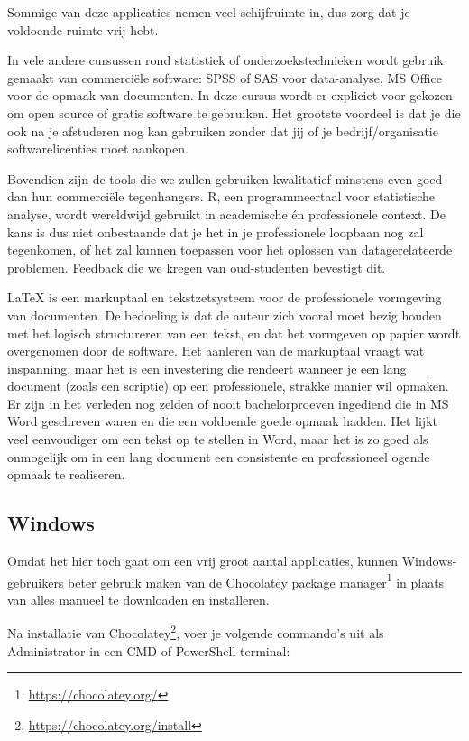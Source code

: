 Sommige van deze applicaties nemen veel schijfruimte in, dus zorg dat je voldoende ruimte vrij hebt.

In vele andere cursussen rond statistiek of onderzoekstechnieken wordt gebruik gemaakt van commerciële software: SPSS of SAS voor data-analyse, MS Office voor de opmaak van documenten. In deze cursus wordt er expliciet voor gekozen om open source of gratis software te gebruiken. Het grootste voordeel is dat je die ook na je afstuderen nog kan gebruiken zonder dat jij of je bedrijf/organisatie softwarelicenties moet aankopen.

Bovendien zijn de tools die we zullen gebruiken kwalitatief minstens even goed dan hun commerciële tegenhangers. R, een programmeertaal voor statistische analyse, wordt wereldwijd gebruikt in academische én professionele context. De kans is dus niet onbestaande dat je het in je professionele loopbaan nog zal tegenkomen, of het zal kunnen toepassen voor het oplossen van datagerelateerde problemen. Feedback die we kregen van oud-studenten bevestigt dit.

\LaTeX{} is een markuptaal en tekstzetsysteem voor de professionele vormgeving van documenten. De bedoeling is dat de auteur zich vooral moet bezig houden met het logisch structureren van een tekst, en dat het vormgeven op papier wordt overgenomen door de software. Het aanleren van de markuptaal vraagt wat inspanning, maar het is een investering die rendeert wanneer je een lang document (zoals een scriptie) op een professionele, strakke manier wil opmaken. Er zijn in het verleden nog zelden of nooit bachelorproeven ingediend die in MS Word geschreven waren en die een voldoende goede opmaak hadden. Het lijkt veel eenvoudiger om een tekst op te stellen in Word, maar het is zo goed als onmogelijk om in een lang document een consistente en professioneel ogende opmaak te realiseren.

\subsection{Windows}

Omdat het hier toch gaat om een vrij groot aantal applicaties, kunnen Windows-gebruikers beter gebruik maken van de Chocolatey package manager\footnote{\url{https://chocolatey.org/}} in plaats van alles manueel te downloaden en installeren.

Na installatie van Chocolatey\footnote{\url{https://chocolatey.org/install}}, voer je volgende commando's uit als Administrator in een CMD of PowerShell terminal:

